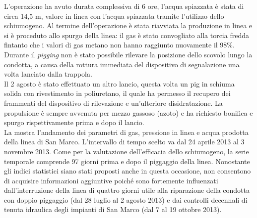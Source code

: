 L'operazione ha avuto durata complessiva di 6 ore, l'acqua spiazzata è stata di circa 14,5 m, valore in linea con l'acqua spiazzata tramite l'utilizzo dello schiumogeno. Al termine dell'operazione è stata riavviata la produzione in linea e si è proceduto allo spurgo della linea: il gas è stato convogliato alla torcia fredda fintanto che i valori di gas metano non hanno raggiunto nuovamente il 98\%. Durante il \textit{pigging} non è stato possibile rilevare la posizione dello scovolo lungo la condotta, a causa della rottura immediata del dispositivo di segnalazione una volta lanciato dalla trappola.\\
Il 2 agosto è stato effettuato un altro lancio, questa volta un pig in schiuma solida con rivestimento in poliuretano, il quale ha permesso il recupero dei frammenti del dispositivo di rilevazione e un'ulteriore disidratazione. La propulsione è sempre avvenuta per mezzo gassoso (azoto) e ha richiesto bonifica e spurgo rispettivamente prima e dopo il lancio.\\
La  mostra l'andamento dei parametri di gas, pressione in linea e acqua prodotta della linea di San Marco. L'intervallo di tempo scelto va dal 24 aprile 2013 al 3 novembre 2013. Come per la valutazione dell'efficacia dello schiumogeno, la serie temporale comprende 97 giorni prima e dopo il piggaggio della linea. Nonostante gli indici statistici siano stati proposti anche in questa occasione, non consentono di acquisire informazioni aggiuntive poiché sono fortemente influenzati dall'interruzione della linea di quattro giorni utile alla riparazione della condotta con doppio piggaggio (dal 28 luglio al 2 agosto 2013) e dai controlli decennali di tenuta idraulica degli impianti di San Marco (dal 7 al 19 ottobre 2013).\\
